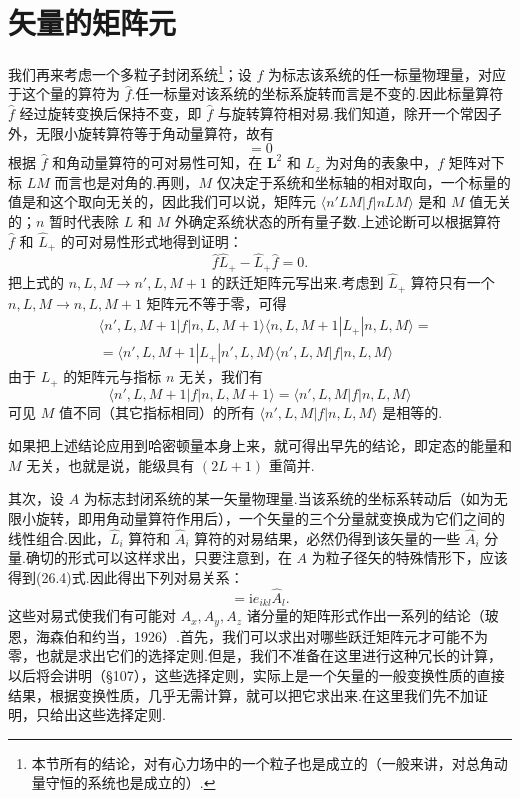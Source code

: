 \section{矢量的矩阵元}

我们再来考虑一个多粒子封闭系统\footnote{本节所有的结论，对有心力场中的一个粒子也是成立的（一般来讲，对总角动量守恒的系统也是成立的）.}；设 $f$ 为标志该系统的任一标量物理量，对应于这个量的算符为 $\hat{f}$.任一标量对该系统的坐标系旋转而言是不变的.因此标量算符 $\hat{f}$ 经过旋转变换后保持不变，即 $\hat{f}$ 与旋转算符相对易.我们知道，除开一个常因子外，无限小旋转算符等于角动量算符，故有
\begin{equation}
  [\hat{f},\hat{\boldsymbol{L}}]=0
\end{equation}
根据 $\hat{f}$ 和角动量算符的可对易性可知，在 $\boldsymbol{L}^2$ 和 $L_z$ 为对角的表象中，$f$ 矩阵对下标 $LM$ 而言也是对角的.再则，$M$ 仅决定于系统和坐标轴的相对取向，一个标量的值是和这个取向无关的，因此我们可以说，矩阵元 $\langle n'LM|f|nLM\rangle$ 是和 $M$ 值无关的；$n$ 暂时代表除 $L$ 和 $M$ 外确定系统状态的所有量子数.上述论断可以根据算符 $\hat{f}$ 和 $\hat{L}_+$ 的可对易性形式地得到证明：
\begin{equation}
  \hat{f}\hat{L}_+-\hat{L}_+\hat{f}=0.
\end{equation}
把上式的 $n,L,M\longrightarrow n',L,M+1$ 的跃迁矩阵元写出来.考虑到 $\hat{L}_+$ 算符只有一个 $n,L,M\longrightarrow n,L,M+1$ 矩阵元不等于零，可得
\begin{equation*}
\begin{aligned}
  &\langle n',L,M+1|f|n,L,M+1\rangle
  \langle n,L,M+1|L_+|n,L,M\rangle=\\
  &=\langle n',L,M+1|L_+|n',L,M\rangle
  \langle n',L,M|f|n,L,M\rangle
\end{aligned}
\end{equation*}
由于 $L_+$ 的矩阵元与指标 $n$ 无关，我们有
\begin{equation}
  \langle n',L,M+1|f|n,L,M+1\rangle
  =\langle n',L,M|f|n,L,M\rangle
\end{equation}
可见 $M$ 值不同（其它指标相同）的所有 $\langle n',L,M|f|n,L,M\rangle$ 是相等的.

如果把上述结论应用到哈密顿量本身上来，就可得出早先的结论，即定态的能量和 $M$ 无关，也就是说，能级具有 $(2L+1)$ 重简并.

其次，设 $A$ 为标志封闭系统的某一矢量物理量.当该系统的坐标系转动后（如为无限小旋转，即用角动量算符作用后），一个矢量的三个分量就变换成为它们之间的线性组合.因此，$\hat{L}_i$ 算符和 $\hat{A}_i$ 算符的对易结果，必然仍得到该矢量的一些 $\hat{A}_i$ 分量.确切的形式可以这样求出，只要注意到，在 $A$ 为粒子径矢的特殊情形下，应该得到(26.4)式.因此得出下列对易关系：
\begin{equation}
  [\hat{L}_i,\hat{A}_k]=\mathrm{i}e_{ikl}\hat{A}_l.
\end{equation}
这些对易式使我们有可能对 $A_x,A_y,A_z$ 诸分量的矩阵形式作出一系列的结论（玻恩，海森伯和约当，1926）.首先，我们可以求出对哪些跃迁矩阵元才可能不为零，也就是求出它们的选择定则.但是，我们不准备在这里进行这种冗长的计算，以后将会讲明（§107），这些选择定则，实际上是一个矢量的一般变换性质的直接结果，根据变换性质，几乎无需计算，就可以把它求出来.在这里我们先不加证明，只给出这些选择定则.

